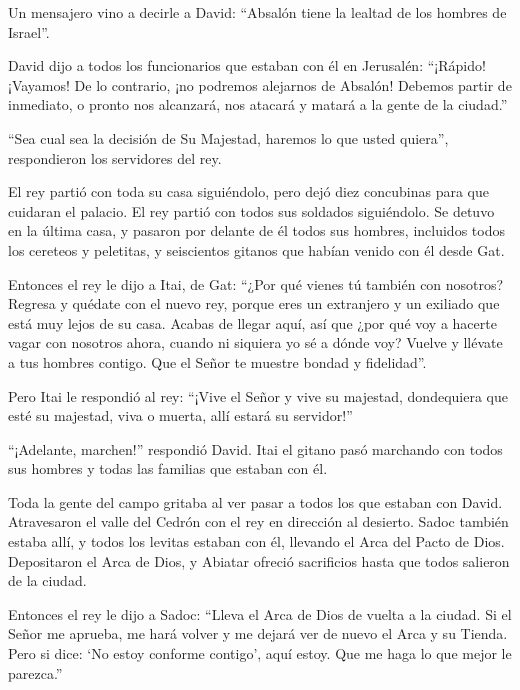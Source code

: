  Un mensajero vino a decirle a David: ``Absalón tiene la
lealtad de los hombres de Israel''.

 David dijo a todos los funcionarios que estaban con él en
Jerusalén: ``¡Rápido! ¡Vayamos! De lo contrario, ¡no podremos alejarnos
de Absalón! Debemos partir de inmediato, o pronto nos alcanzará, nos
atacará y matará a la gente de la ciudad.''

 ``Sea cual sea la decisión de Su Majestad, haremos lo que
usted quiera'', respondieron los servidores del rey.

 El rey partió con toda su casa siguiéndolo, pero dejó diez
concubinas para que cuidaran el palacio.  El rey partió con
todos sus soldados siguiéndolo. Se detuvo en la última casa,
 y pasaron por delante de él todos sus hombres, incluidos
todos los cereteos y peletitas, y seiscientos gitanos que habían venido
con él desde Gat.

 Entonces el rey le dijo a Itai, de Gat: ``¿Por qué vienes
tú también con nosotros? Regresa y quédate con el nuevo rey, porque eres
un extranjero y un exiliado que está muy lejos de su casa. 
Acabas de llegar aquí, así que ¿por qué voy a hacerte vagar con nosotros
ahora, cuando ni siquiera yo sé a dónde voy? Vuelve y llévate a tus
hombres contigo. Que el Señor te muestre bondad y fidelidad''.

 Pero Itai le respondió al rey: ``¡Vive el Señor y vive su
majestad, dondequiera que esté su majestad, viva o muerta, allí estará
su servidor!''

 ``¡Adelante, marchen!'' respondió David. Itai el gitano
pasó marchando con todos sus hombres y todas las familias que estaban
con él.

 Toda la gente del campo gritaba al ver pasar a todos los
que estaban con David. Atravesaron el valle del Cedrón con el rey en
dirección al desierto.  Sadoc también estaba allí, y todos
los levitas estaban con él, llevando el Arca del Pacto de Dios.
Depositaron el Arca de Dios, y Abiatar ofreció sacrificios hasta que
todos salieron de la ciudad.

 Entonces el rey le dijo a Sadoc: ``Lleva el Arca de Dios
de vuelta a la ciudad. Si el Señor me aprueba, me hará volver y me
dejará ver de nuevo el Arca y su Tienda.  Pero si dice: `No
estoy conforme contigo', aquí estoy. Que me haga lo que mejor le
parezca.''

